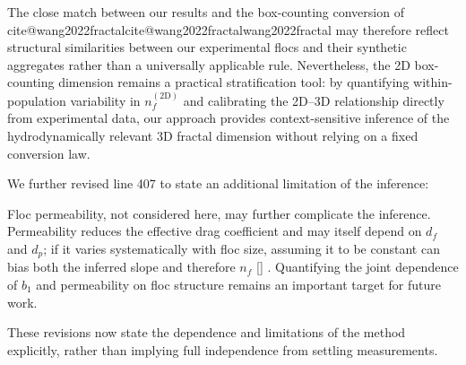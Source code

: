 \documentclass[11pt]{article}
\makeatletter
\newenvironment{Snippet}{%
  \par\vspace{0.3em}\begin{list}{}{\setlength{\leftmargin}{1em}\setlength{\rightmargin}{0.5em}}\item\small\itshape
}{%
  \end{list}\vspace{0.3em}
}
\newcommand{\citelookup}[1]{%
  \ifcsname cite@#1\endcsname\csname cite@#1\endcsname\else #1\fi
}
\newcommand{\citeformat}[1]{%
  \def\citelist{}%
  \forcsvlist{\addtocitelist}{#1}%
  \textup{[\citelist]}%
}
\newcommand{\addtocitelist}[1]{%
  \ifx\citelist\empty
    \edef\citelist{\citelookup{#1}}%
  \else
    \edef\citelist{\citelist;\space\citelookup{#1}}%
  \fi
}
\renewcommand{\cite}[1]{\citeformat{#1}}
\newcommand{\citeA}[1]{\textup{\citelookup{#1}}}
\makeatother
\begin{document}
\begin{enumerate}[label=\textbf{R3.\arabic*.}]
\begin{Snippet}
The close match between our results and the box-counting conversion of \citeA{wang2022fractal} may therefore reflect structural similarities between our experimental flocs and their synthetic aggregates rather than a universally applicable rule. Nevertheless, the 2D box-counting dimension remains a practical stratification tool: by quantifying within-population variability in $n_f^{(\mathrm{2D})}$ and calibrating the 2D--3D relationship directly from experimental data, our approach provides context-sensitive inference of the hydrodynamically relevant 3D fractal dimension without relying on a fixed conversion law.
\end{Snippet}
We further revised line 407 to state an additional limitation of the inference:
\begin{Snippet}
Floc permeability, not considered here, may further complicate the inference. Permeability reduces the effective drag coefficient and may itself depend on $d_f$ and $d_p$; if it varies systematically with floc size, assuming it to be constant can bias both the inferred slope and therefore $n_f$ \cite{nghiem2024testing}. Quantifying the joint dependence of $b_1$ and permeability on floc structure remains an important target for future work.
\end{Snippet}
These revisions now state the dependence and limitations of the method explicitly, rather than implying full independence from settling measurements.


\end{enumerate}
\end{document}
